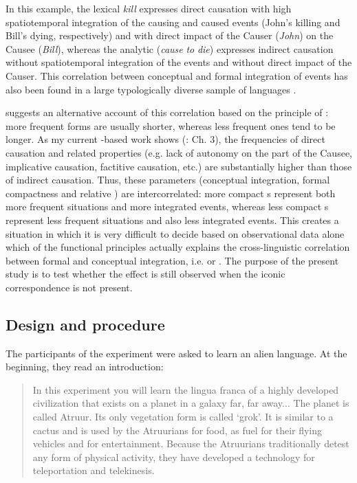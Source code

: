 \documentclass[output=paper]{langsci/langscibook}
\begin{document}
\noindent In this example, the lexical  \textit{kill} expresses direct causation with high spatiotemporal integration of the causing and caused events (John’s killing and Bill’s dying, respectively) and with direct impact of the Causer (\textit{John}) on the Causee (\textit{Bill}), whereas the analytic  (\textit{cause} \textit{to} \textit{die}) expresses indirect causation without spatiotemporal integration of the events and without direct impact of the Causer. This correlation between conceptual and formal integration of events has also been found in a large typologically diverse sample of languages \citep{Levshina2018_CausTyp}.

\citet{Haspelmath2008_FreqIcon} suggests an alternative account of this correlation based on the principle of : more frequent forms are usually shorter, whereas less frequent ones tend to be longer. As my current -based work shows (\citealt{Levshina2018_Effic}: Ch. 3), the frequencies of direct causation and related properties (e.g. lack of autonomy on the part of the Causee, implicative causation, factitive causation, etc.) are substantially higher than those of indirect causation. Thus, these parameters (conceptual integration, formal compactness and relative ) are intercorrelated: more compact s represent both more frequent situations and more integrated events, whereas less compact s represent less frequent situations and also less integrated events. This creates a situation in which it is very difficult to decide based on observational data alone which of the functional principles actually explains the cross-linguistic correlation between formal and conceptual integration, i.e.  or . The purpose of the present study is to test whether the  effect is still observed when the iconic correspondence is not present. 

\subsection{Design and procedure}

The participants of the experiment were asked to learn an alien language. At the beginning, they read an introduction:

\begin{quote}
In this experiment you will learn the lingua franca of a highly developed civilization that exists on a planet in a galaxy far, far away...  The planet is called Atruur. Its only vegetation form is called ‘grok’. It is similar to a cactus and is used by the Atruurians for food, as fuel for their flying vehicles and for entertainment. Because the Atruurians traditionally detest any form of physical activity, they have developed a technology for teleportation and telekinesis.
\end{quote}
\end{document}

